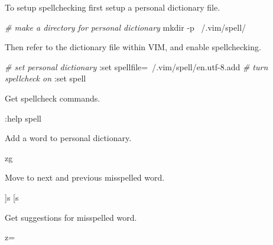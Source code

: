 \documentclass[]{book}
\newenvironment{Shaded}{\begin{snugshade}}{\end{snugshade}}
\newcommand{\CommentTok}[1]{\textcolor[rgb]{0.56,0.35,0.01}{\textit{#1}}}
\newcommand{\ExtensionTok}[1]{#1}
\newcommand{\FunctionTok}[1]{\textcolor[rgb]{0.00,0.00,0.00}{#1}}
\newcommand{\NormalTok}[1]{#1}
\newcommand{\VariableTok}[1]{\textcolor[rgb]{0.00,0.00,0.00}{#1}}
\begin{document}
To setup spellchecking first setup a personal dictionary file.

\begin{Shaded}
\begin{Highlighting}[]
\CommentTok{# make a directory for personal dictionary}
\FunctionTok{mkdir}\NormalTok{ -p ~/.vim/spell/}
\end{Highlighting}
\end{Shaded}

Then refer to the dictionary file within VIM, and enable spellchecking.

\begin{Shaded}
\begin{Highlighting}[]
\CommentTok{# set personal dictionary}
\NormalTok{:}\ExtensionTok{set}\NormalTok{ spellfile=~/.vim/spell/en.utf-8.add}
\CommentTok{# turn spellcheck on}
\NormalTok{:}\ExtensionTok{set}\NormalTok{ spell}
\end{Highlighting}
\end{Shaded}

Get spellcheck commands.

\begin{Shaded}
\begin{Highlighting}[]
\NormalTok{:}\ExtensionTok{help}\NormalTok{ spell}
\end{Highlighting}
\end{Shaded}

Add a word to personal dictionary.

\begin{Shaded}
\begin{Highlighting}[]
\ExtensionTok{zg}
\end{Highlighting}
\end{Shaded}

Move to next and previous misspelled word.

\begin{Shaded}
\begin{Highlighting}[]
\NormalTok{]}\ExtensionTok{s}
\NormalTok{[}\ExtensionTok{s}
\end{Highlighting}
\end{Shaded}

Get suggestions for misspelled word.

\begin{Shaded}
\begin{Highlighting}[]
\VariableTok{z=}
\end{Highlighting}
\end{Shaded}
\end{document}
